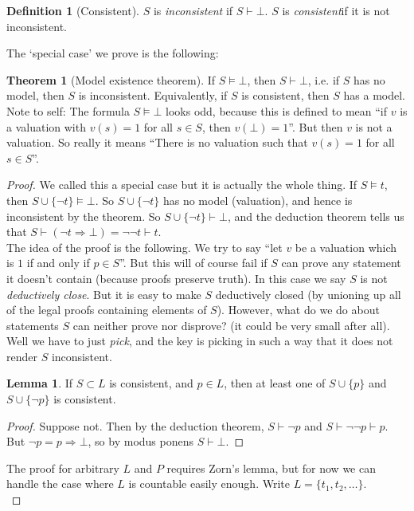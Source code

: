 \documentclass{article}
\theoremstyle{definition}
\newtheorem{definition}{Definition}
\newtheorem{theorem}{Theorem}
\newtheorem{lemma}{Lemma}
\numberwithin{definition}{section}
\newcommand{\entails}{\models}
\newcommand{\proves}{\vdash}
\begin{document}
\begin{definition}[Consistent]
$S$ is \textit{inconsistent} if $S \proves \bot$. $S$ is \textit{consistent}if it is not inconsistent.
\end{definition}
The `special case' we prove is the following:
\begin{theorem}[Model existence theorem]
If $S \entails \bot$, then $S \proves \bot$, i.e. if $S$ has no model, then $S$ is inconsistent. Equivalently, if $S$ is consistent, then $S$ has a model. Note to self: The formula $S \entails \bot$ looks odd, because this is defined to mean ``if $v$ is a valuation with $v(s)=1$ for all $s \in S$, then $v(\bot)=1$''. But then $v$ is not a valuation. So really it means ``There is no valuation such that $v(s)=1$ for all $s \in S$''.
\end{theorem}
\begin{proof}
We called this a special case but it is actually the whole thing. If $S \entails t$, then $S \cup \{\neg t\} \entails \bot$. So $S \cup \{\neg t\}$ has no model (valuation), and hence is inconsistent by the theorem. So $S \cup \{\neg t\} \proves \bot$, and the deduction theorem tells us that $S \proves (\neg t \Rightarrow \bot) = \neg \neg t \proves t$. \\
The idea of the proof is the following. We try to say ``let $v$ be a valuation which is $1$ if and only if $p \in S$''. But this will of course fail if $S$ can prove any statement it doesn't contain (because proofs preserve truth). In this case we say $S$ is not \textit{deductively close}. But it is easy to make $S$ deductively closed (by unioning up all of the legal proofs containing elements of $S$). However, what do we do about statements $S$ can neither prove nor disprove? (it could be very small after all). Well we have to just \textit{pick}, and the key is picking in such a way that it does not render $S$ inconsistent. 
\begin{lemma}
If $S \subset L$ is consistent, and $p \in L$, then at least one of $S \cup \{p\}$ and $S \cup \{\neg p\}$ is consistent. 
\end{lemma} 
\begin{proof}
Suppose not. Then by the deduction theorem, $S \proves \neg p$ and $S \proves \neg \neg p \proves p$. But $\neg p = p \Rightarrow \bot$, so by modus ponens $S \proves \bot$. 
\end{proof}
The proof for arbitrary $L$ and $P$ requires Zorn's lemma, but for now we can handle the case where $L$ is countable easily enough. Write $L = \{t_{1},t_{2},\ldots\}$. \\

\end{proof}
\end{document}
